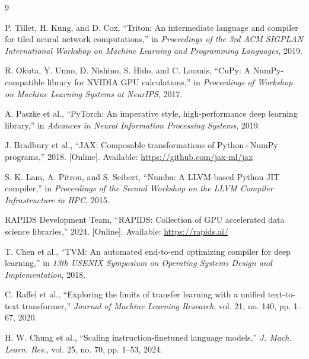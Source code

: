 \documentclass[conference]{IEEEtran}
\begin{document}
\begin{thebibliography}{9}

P. Tillet, H. Kung, and D. Cox, ``Triton: An intermediate language and compiler
for tiled neural network computations,'' in \emph{Proceedings of the 3rd ACM
SIGPLAN International Workshop on Machine Learning and Programming Languages},
2019.

R. Okuta, Y. Unno, D. Nishino, S. Hido, and C. Loomis, ``CuPy: A NumPy-compatible
library for NVIDIA GPU calculations,'' in \emph{Proceedings of Workshop on
Machine Learning Systems at NeurIPS}, 2017.

A. Paszke et al., ``PyTorch: An imperative style, high-performance deep learning
library,'' in \emph{Advances in Neural Information Processing Systems}, 2019.

J. Bradbury et al., ``JAX: Composable transformations of Python+NumPy programs,''
2018. [Online]. Available: \url{https://github.com/jax-ml/jax}

S. K. Lam, A. Pitrou, and S. Seibert, ``Numba: A LLVM-based Python JIT
compiler,'' in \emph{Proceedings of the Second Workshop on the LLVM Compiler
Infrastructure in HPC}, 2015.

RAPIDS Development Team, ``RAPIDS: Collection of GPU accelerated data science
libraries,'' 2024. [Online]. Available: \url{https://rapids.ai/}

T. Chen et al., ``TVM: An automated end-to-end optimizing compiler for deep
learning,'' in \emph{13th USENIX Symposium on Operating Systems Design and
Implementation}, 2018.

C. Raffel et al., ``Exploring the limits of transfer learning with a unified
text-to-text transformer,'' \emph{Journal of Machine Learning Research}, vol.
21, no. 140, pp. 1--67, 2020.

H. W. Chung et al., ``Scaling instruction-finetuned language models,'' \emph{J.
Mach. Learn. Res.}, vol. 25, no. 70, pp. 1--53, 2024.

\end{thebibliography}
\end{document}
